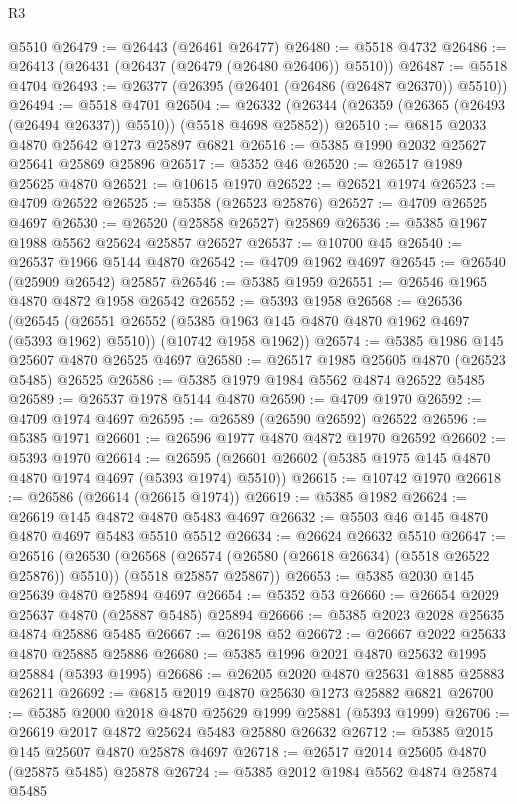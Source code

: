 \begin{lexlean}{R3}
\begin{coremodule}
    @5510
@26479 := @26443 (@26461 @26477)
@26480 := @5518 @4732
@26486 := @26413 (@26431 (@26437 (@26479 (@26480 @26406)) @5510))
@26487 := @5518 @4704
@26493 := @26377 (@26395 (@26401 (@26486 (@26487 @26370)) @5510))
@26494 := @5518 @4701
@26504 := @26332 (@26344 (@26359 (@26365 (@26493 (@26494 @26337)) @5510)) (@5518 @4698 @25852))
@26510 := @6815 @2033 @4870 @25642 @1273 @25897 @6821
@26516 := @5385 @1990 @2032 @25627 @25641 @25869 @25896
@26517 := @5352 @46
@26520 := @26517 @1989 @25625 @4870
@26521 := @10615 @1970
@26522 := @26521 @1974
@26523 := @4709 @26522
@26525 := @5358 (@26523 @25876)
@26527 := @4709 @26525 @4697
@26530 := @26520 (@25858 @26527) @25869
@26536 := @5385 @1967 @1988 @5562 @25624 @25857 @26527
@26537 := @10700 @45
@26540 := @26537 @1966 @5144 @4870
@26542 := @4709 @1962 @4697
@26545 := @26540 (@25909 @26542) @25857
@26546 := @5385 @1959
@26551 := @26546 @1965 @4870 @4872 @1958 @26542
@26552 := @5393 @1958
@26568 := @26536
    (@26545
      (@26551 @26552 (@5385 @1963 @145 @4870 @4870 @1962 @4697 (@5393 @1962) @5510))
      (@10742 @1958 @1962))
@26574 := @5385 @1986 @145 @25607 @4870 @26525 @4697
@26580 := @26517 @1985 @25605 @4870 (@26523 @5485) @26525
@26586 := @5385 @1979 @1984 @5562 @4874 @26522 @5485
@26589 := @26537 @1978 @5144 @4870
@26590 := @4709 @1970
@26592 := @4709 @1974 @4697
@26595 := @26589 (@26590 @26592) @26522
@26596 := @5385 @1971
@26601 := @26596 @1977 @4870 @4872 @1970 @26592
@26602 := @5393 @1970
@26614 := @26595 (@26601 @26602 (@5385 @1975 @145 @4870 @4870 @1974 @4697 (@5393 @1974) @5510))
@26615 := @10742 @1970
@26618 := @26586 (@26614 (@26615 @1974))
@26619 := @5385 @1982
@26624 := @26619 @145 @4872 @4870 @5483 @4697
@26632 := @5503 @46 @145 @4870 @4870 @4697 @5483 @5510 @5512
@26634 := @26624 @26632 @5510
@26647 := @26516
    (@26530
      (@26568 (@26574 (@26580 (@26618 @26634) (@5518 @26522 @25876)) @5510))
      (@5518 @25857 @25867))
@26653 := @5385 @2030 @145 @25639 @4870 @25894 @4697
@26654 := @5352 @53
@26660 := @26654 @2029 @25637 @4870 (@25887 @5485) @25894
@26666 := @5385 @2023 @2028 @25635 @4874 @25886 @5485
@26667 := @26198 @52
@26672 := @26667 @2022 @25633 @4870 @25885 @25886
@26680 := @5385 @1996 @2021 @4870 @25632 @1995 @25884 (@5393 @1995)
@26686 := @26205 @2020 @4870 @25631 @1885 @25883 @26211
@26692 := @6815 @2019 @4870 @25630 @1273 @25882 @6821
@26700 := @5385 @2000 @2018 @4870 @25629 @1999 @25881 (@5393 @1999)
@26706 := @26619 @2017 @4872 @25624 @5483 @25880 @26632
@26712 := @5385 @2015 @145 @25607 @4870 @25878 @4697
@26718 := @26517 @2014 @25605 @4870 (@25875 @5485) @25878
@26724 := @5385 @2012 @1984 @5562 @4874 @25874 @5485

\end{coremodule}
\end{lexlean}
